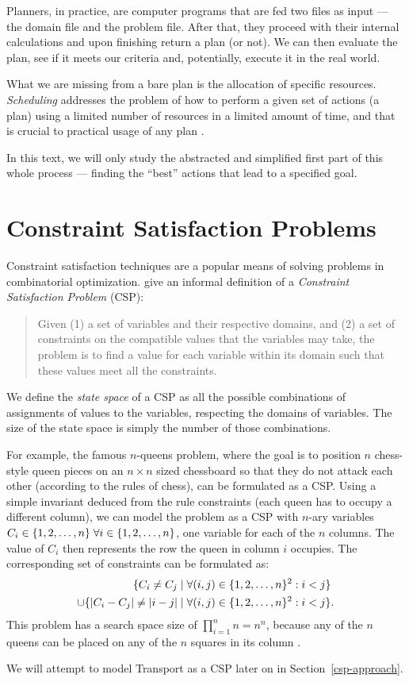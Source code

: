 Planners, in practice, are computer programs that are fed two files as input
--- the domain file and the problem file. After that, they proceed with their internal calculations
and upon finishing return a plan (or not). 
We can then evaluate the plan, see if it meets our criteria and, potentially,
execute it in the real world.

What we are missing from a bare plan is the allocation of specific resources.
\textit{Scheduling} addresses the problem of how to perform a given set of actions (a plan)
using a limited number of resources in a limited amount of time, and
that is crucial to practical usage of any plan \citep[Chapter~15]{Ghallab2004}.

In this text, we will only study the abstracted and simplified first part of this whole process
--- finding the ``best'' actions that lead to a specified goal.


\section{Constraint Satisfaction Problems}\label{csp}

Constraint satisfaction techniques are a popular means of solving problems in combinatorial optimization. \citet[Section~8.1]{Ghallab2004} give an informal definition of a
\textit{Constraint Satisfaction Problem} (CSP):
\begin{quote}
Given (1) a set of variables and their respective domains, and (2) a set of constraints on the compatible values that the variables may take, the problem is to find a value for each variable within its domain such that these values meet all the constraints.
\end{quote}

We define the \textit{state space} of a CSP as all the possible combinations of assignments of values to the variables, respecting the domains of variables.
The size of the state space is simply the number of those combinations.

For example, the famous $n$-queens problem, where the goal is to position $n$ chess-style queen pieces on an $n \times n$ sized chessboard so that they do not attack each other (according to the rules of chess), can be formulated as a CSP. Using a simple invariant deduced from the rule constraints (each queen has to occupy a different column),
we can model the problem as a CSP with $n$-ary variables $C_i \in \kset[n]{}\; \forall i \in \kset[n]{}$, one variable for each of the $n$ columns. The value of $C_i$ then represents the row the queen in column $i$ occupies.
The corresponding set of constraints can be formulated as:
\begin{align*}
\{C_i \neq C_j \;|\; &\forall (i, j) \in \kset[n]{}^2 : i < j\}\\
\cup \{|C_i-C_j| \neq |i-j| \;|\; &\forall (i, j) \in \kset[n]{}^2 : i < j\}.
\end{align*}
This problem has a search space size of $\prod_{i=1}^n n = n^n$, because any of the $n$ queens can be placed on any of the $n$ squares in its column \citep{Russell1995}.

We will attempt to model Transport as a CSP later on in Section~\ref{csp-approach}.








